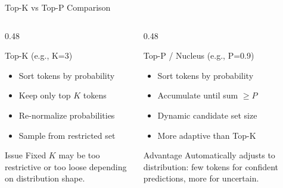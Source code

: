 \documentclass[aspectratio=169, 11pt]{beamer}
\begin{document}
\begin{frame}{Top-K vs Top-P Comparison}

	\begin{columns}[T]
		\begin{column}{0.48\textwidth}
			\begin{block}{Top-K (e.g., K=3)}
				\begin{itemize}
					\item Sort tokens by probability
					\item Keep only top $K$ tokens
					\item Re-normalize probabilities
					\item Sample from restricted set
				\end{itemize}
				\begin{alertblock}{Issue}
					Fixed $K$ may be too restrictive or too loose depending on distribution shape.
				\end{alertblock}
			\end{block}
		\end{column}
		\begin{column}{0.48\textwidth}
			\begin{block}{Top-P / Nucleus (e.g., P=0.9)}
				\begin{itemize}
					\item Sort tokens by probability
					\item Accumulate until sum $\geq P$
					\item Dynamic candidate set size
					\item More adaptive than Top-K
				\end{itemize}
				\begin{alertblock}{Advantage}
					Automatically adjusts to distribution: few tokens for confident predictions, more for uncertain.
				\end{alertblock}
			\end{block}
		\end{column}
	\end{columns}

\end{frame}
\end{document}
